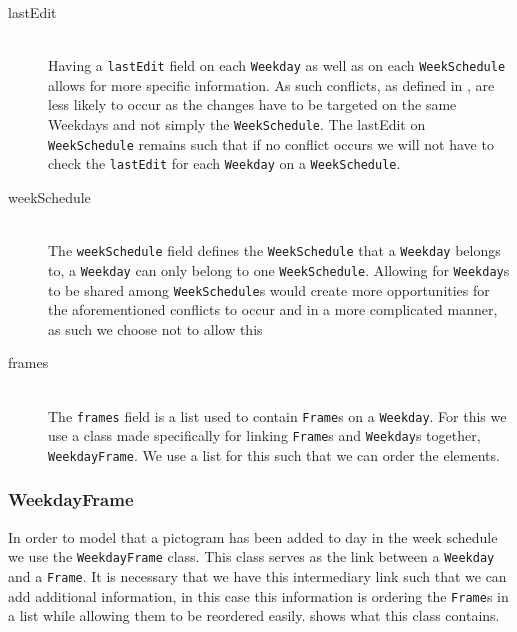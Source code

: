 \begin{description}
    \item [lastEdit] \hfill \\
    Having a \texttt{lastEdit} field on each \texttt{Weekday} as well as on each \texttt{WeekSchedule} allows for more specific information. 
    As such conflicts, as defined in , are less likely to occur as the changes have to be targeted on the same Weekdays and not simply the \texttt{WeekSchedule}. 
    The lastEdit on \texttt{WeekSchedule} remains such that if no conflict occurs we will not have to check the \texttt{lastEdit} for each \texttt{Weekday} on a \texttt{WeekSchedule}.
    \item [weekSchedule] \hfill \\
    The \texttt{weekSchedule} field defines the \texttt{WeekSchedule} that a \texttt{Weekday} belongs to, a \texttt{Weekday} can only belong to one \texttt{WeekSchedule}.
    Allowing for \texttt{Weekday}s to be shared among \texttt{WeekSchedule}s would create more opportunities for the aforementioned conflicts to occur and in a more complicated manner, as such we choose not to allow this
    \item [frames] \hfill \\
    The \texttt{frames} field is a list used to contain \texttt{Frame}s on a \texttt{Weekday}.
    For this we use a class made specifically for linking \texttt{Frame}s and \texttt{Weekday}s together, \texttt{WeekdayFrame}.
    We use a list for this such that we can order the elements.
\end{description}

\subsubsection{WeekdayFrame}
In order to model that a pictogram has been added to day in the week schedule we use the \texttt{WeekdayFrame} class.
This class serves as the link between a \texttt{Weekday} and a \texttt{Frame}.
It is necessary that we have this intermediary link such that we can add additional information, in this case this information is ordering the \texttt{Frame}s in a list while allowing them to be reordered easily.
 shows what this class contains.

